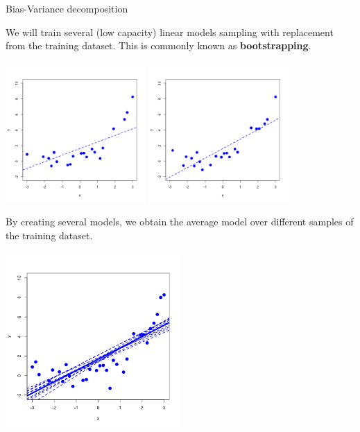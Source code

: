 \documentclass[11pt,compress,t,notes=noshow, xcolor=table]{beamer}
\begin{document}
\begin{vbframe} {Bias-Variance decomposition}
\framebreak

We will train several (low capacity) linear models sampling with replacement from the training dataset. This is commonly known as \textbf{bootstrapping}.

\begin{center}
  \includegraphics[width = 0.4\textwidth]{figure/bias_variance_decomposition-bootstrap_1.png}
  \includegraphics[width = 0.4\textwidth]{figure/bias_variance_decomposition-bootstrap_2.png}
\end{center}

\framebreak

By creating several models, we obtain the average model over different samples of the training dataset.

\begin{center}
  \includegraphics[width = 0.5\textwidth]{figure/bias_variance_decomposition-linear_model.png}
\end{center}


\end{vbframe}
\end{document}
